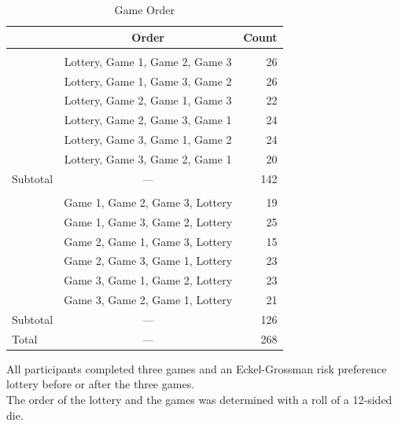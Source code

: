 \begin{table}[t]
\caption{Game Order \label{tab:game_order}} 

\begin{tabular*}{\linewidth}{@{\extracolsep{\fill}}l|cr}
\toprule
 & Order & Count \\ 
\midrule\addlinespace[2.5pt]
\multicolumn{3}{l}{Lottery Before} \\[2.5pt] 
\midrule\addlinespace[2.5pt]
 & Lottery, Game 1, Game 2, Game 3 & 26 \\ 
 & Lottery, Game 1, Game 3, Game 2 & 26 \\ 
 & Lottery, Game 2, Game 1, Game 3 & 22 \\ 
 & Lottery, Game 2, Game 3, Game 1 & 24 \\ 
 & Lottery, Game 3, Game 1, Game 2 & 24 \\ 
 & Lottery, Game 3, Game 2, Game 1 & 20 \\ 
\midrule 
Subtotal & — & 142 \\ 
\midrule\addlinespace[2.5pt]
\multicolumn{3}{l}{Lottery After} \\[2.5pt] 
\midrule\addlinespace[2.5pt]
 & Game 1, Game 2, Game 3, Lottery & 19 \\ 
 & Game 1, Game 3, Game 2, Lottery & 25 \\ 
 & Game 2, Game 1, Game 3, Lottery & 15 \\ 
 & Game 2, Game 3, Game 1, Lottery & 23 \\ 
 & Game 3, Game 1, Game 2, Lottery & 23 \\ 
 & Game 3, Game 2, Game 1, Lottery & 21 \\ 
\midrule 
Subtotal & — & 126 \\ 
\midrule 
\midrule 
Total & — & 268 \\ 
\bottomrule
\end{tabular*}
\begin{minipage}{\linewidth}
\vspace{.05em}
All participants completed three games and an Eckel-Grossman 
  risk preference lottery before or after the three games.\\
The order of
  the lottery and the games was determined with a roll of a 12-sided die.\\
\end{minipage}
\end{table}

